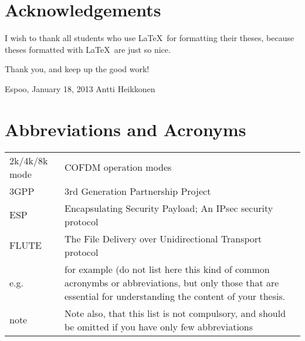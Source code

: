 \documentclass[12pt,a4paper,oneside,pdftex]{report}
\newcommand{\DATE}{January 18, 2013}
\newcommand{\AUTHOR}{Antti Heikkonen}
\begin{document}


\chapter*{Acknowledgements}

I wish to thank all students who use \LaTeX\ for formatting their theses,
because theses formatted with \LaTeX\ are just so nice.

Thank you, and keep up the good work!
\vskip 10mm

\noindent Espoo, \DATE
\vskip 5mm
\noindent\AUTHOR

\cleardoublepage
% 

\chapter*{Abbreviations and Acronyms}


\noindent
\begin{longtable}{@{}p{}p{}@{}}
2k/4k/8k mode & COFDM operation modes \\
3GPP & 3rd Generation Partnership Project \\
ESP & Encapsulating Security Payload; An IPsec security protocol \\
FLUTE  & The File Delivery over Unidirectional Transport protocol \\
e.g.& for example (do not list here this kind of common acronymbs or abbreviations, but only those that are essential for understanding the content of your thesis. \\
note & Note also, that this list is not compulsory, and should be omitted if you have only few abbreviations

\end{longtable}
\end{document}
